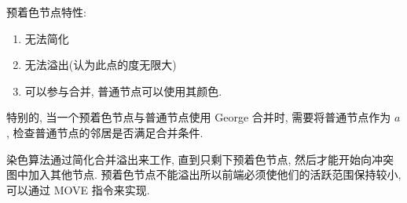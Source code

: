 预着色节点特性:
\begin{enumerate}
    \item 无法简化
    \item 无法溢出(认为此点的度无限大)
    \item 可以参与合并, 普通节点可以使用其颜色. 
\end{enumerate}
特别的, 当一个预着色节点与普通节点使用 George 合并时, 需要将普通节点作为 $a$, 检查普通节点的邻居是否满足合并条件. 


染色算法通过简化合并溢出来工作, 直到只剩下预着色节点, 然后才能开始向冲突图中加入其他节点. 预着色节点不能溢出所以前端必须使他们的活跃范围保持较小, 可以通过 MOVE 指令来实现. 



